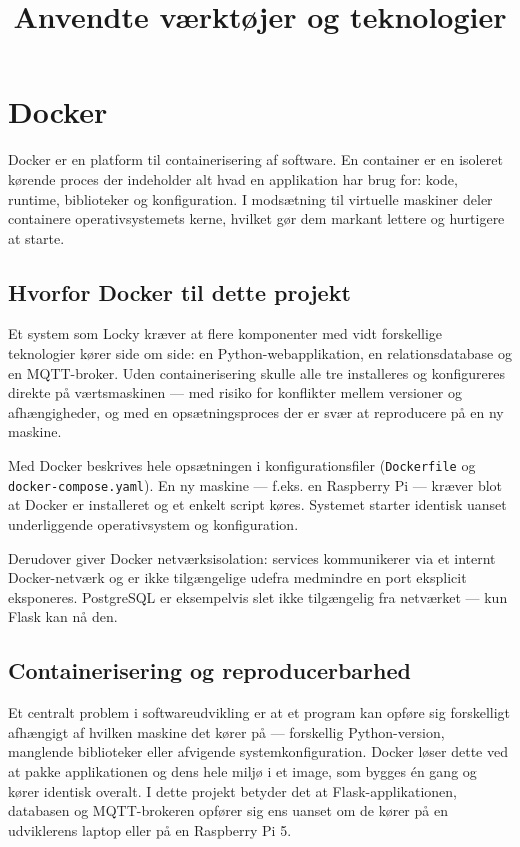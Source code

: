 \documentclass[a4paper,12pt]{article}
\title{Anvendte værktøjer og teknologier}
\date{}
\begin{document}
\maketitle

\section{Docker}

Docker er en platform til containerisering af software. En container er en isoleret kørende proces der indeholder alt hvad en applikation har brug for: kode, runtime, biblioteker og konfiguration. I modsætning til virtuelle maskiner deler containere operativsystemets kerne, hvilket gør dem markant lettere og hurtigere at starte.

\subsection{Hvorfor Docker til dette projekt}

Et system som Locky kræver at flere komponenter med vidt forskellige teknologier kører side om side: en Python-webapplikation, en relationsdatabase og en MQTT-broker. Uden containerisering skulle alle tre installeres og konfigureres direkte på værtsmaskinen — med risiko for konflikter mellem versioner og afhængigheder, og med en opsætningsproces der er svær at reproducere på en ny maskine.

Med Docker beskrives hele opsætningen i konfigurationsfiler (\texttt{Dockerfile} og \texttt{docker-compose.yaml}). En ny maskine — f.eks. en Raspberry Pi — kræver blot at Docker er installeret og et enkelt script køres. Systemet starter identisk uanset underliggende operativsystem og konfiguration.

Derudover giver Docker netværksisolation: services kommunikerer via et internt Docker-netværk og er ikke tilgængelige udefra medmindre en port eksplicit eksponeres. PostgreSQL er eksempelvis slet ikke tilgængelig fra netværket — kun Flask kan nå den.

\subsection{Containerisering og reproducerbarhed}

Et centralt problem i softwareudvikling er at et program kan opføre sig forskelligt afhængigt af hvilken maskine det kører på — forskellig Python-version, manglende biblioteker eller afvigende systemkonfiguration. Docker løser dette ved at pakke applikationen og dens hele miljø i et image, som bygges én gang og kører identisk overalt. I dette projekt betyder det at Flask-applikationen, databasen og MQTT-brokeren opfører sig ens uanset om de kører på en udviklerens laptop eller på en Raspberry Pi 5.
\end{document}
